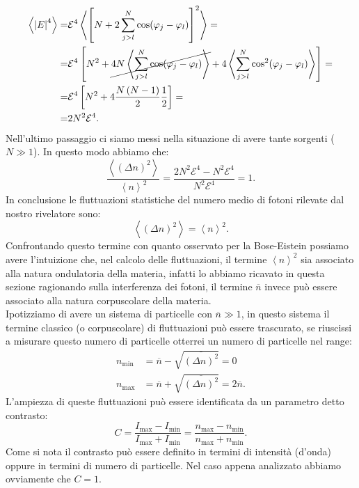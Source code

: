 \[\begin{aligned}
	\left<\left| E \right| ^4 \right> 
	=&
	\mathcal{E}^4 
	\left<
	\left[ 
	N + 2 \sum_{j >  l}^{N} \cos( \varphi_j-\varphi_l) 
	\right]^2
	\right> =\\
	=&
	\mathcal{E}^4 
	\left[ 
	N^2 
	+
	\cancel{
	4N
	\left<	
	\sum_{j>l}^{N} \cos( \varphi_j - \varphi_l)  
	\right>
	}
	+
	4 
	\left<
	\sum_{j>l}^{N} \cos^2( \varphi_j-\varphi_l) 
	\right>
	\right]=\\
	=&
	\mathcal{E} ^4 
	\left[ 
	N^2 
	+
	4 \frac{N\left( N-1 \right)}{2} \frac{1}{2} 
	\right] =\\
	=&
	2N^2 \mathcal{E}^4 
.\end{aligned}\]
Nell'ultimo passaggio ci siamo messi nella situazione di avere tante sorgenti ($N\gg 1$).
In questo modo abbiamo che:
\[
	\frac{\left<\left( \Delta n \right) ^2 \right>}{\left< n \right>^2}
	=
	\frac{2N^2\mathcal{E}^4 - N^2\mathcal{E}^4}{N^2\mathcal{E}^4}
	=
	1
.\] 
In conclusione le fluttuazioni statistiche del numero medio di fotoni rilevate dal nostro rivelatore sono:
\[
	\left<\left( \Delta n \right)^2 \right> = \left<n \right>^2
.\] 
Confrontando questo termine con quanto osservato per la Bose-Eistein possiamo avere l'intuizione che, nel calcolo delle fluttuazioni, il termine $\left<n \right>^2$ sia associato alla natura ondulatoria della materia, infatti lo abbiamo ricavato in questa sezione ragionando sulla interferenza dei fotoni, il termine $\overline{n}$ invece può essere associato alla natura corpuscolare della materia.\\
Ipotizziamo di avere un sistema di particelle con $\overline{n}\gg 1$, in questo sistema il termine classico (o corpuscolare) di fluttuazioni può essere trascurato, se riuscissi a misurare questo numero di particelle otterrei un numero di particelle nel range:
\[\begin{aligned}
	n_\text{min} &= \overline{n}-\sqrt{\overline{\left( \Delta n \right)^2}} = 0\\
	n_\text{max} &= \overline{n}+\sqrt{\overline{\left( \Delta n \right)^2}} 
	= 2\overline{n}
.\end{aligned}\]
L'ampiezza di queste fluttuazioni può essere identificata da un parametro detto contrasto:
\[
	C = \frac{I_\text{max} - I_\text{min}}{I_\text{max} + I_\text{min}} =
	\frac{n_\text{max} - n_\text{min} }{n_\text{max} + n_\text{min} }
.\] 
Come si nota il contrasto può essere definito in termini di intensità (d'onda) oppure in termini di numero di particelle. Nel caso appena analizzato abbiamo ovviamente che $C=1$.\\
